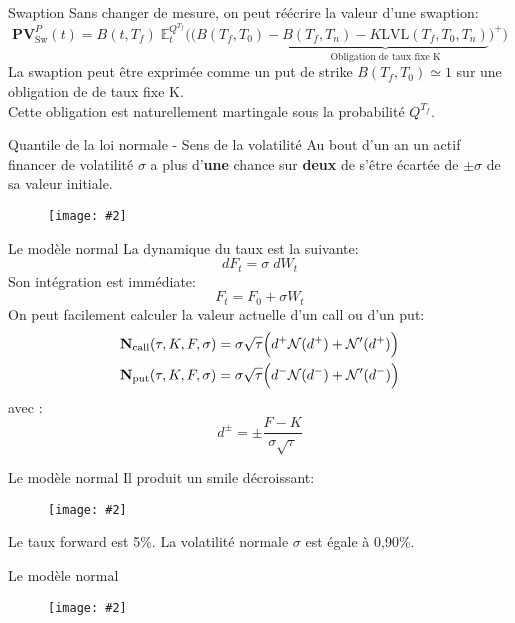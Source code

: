 \documentclass{beamer}
\newcommand{\FIG}[2]{\texttt{[image: \#2]}}
\begin{document}
\begin{frame}{Swaption}
Sans changer de mesure, on peut réécrire la valeur d'une swaption:
\[
\textbf{PV}_\text{Sw}^P(t)=B(t,T_f)\;\mathbb{E}_t^{Q^{T_f}}\Big(\big(B(T_f,T_0)-\underbrace{B(T_f,T_n)-K\text{LVL}(T_f,T_0,T_n)}_{\text{Obligation de taux fixe K}}\big)^+\Big)
\]
La swaption peut être exprimée comme un put de strike $B(T_f,T_0)\simeq1$ sur une obligation de de taux fixe K.\\
\vspace{0.5cm}
Cette obligation est naturellement martingale sous la probabilité $Q^{T_f}$.
\end{frame}

\begin{frame}{Quantile de la loi normale - Sens de la volatilité}
Au bout d'un an un actif financer de volatilité $\sigma$ a plus d'\textbf{une} chance sur \textbf{deux} de s'être écartée de $\pm \sigma$ de sa valeur initiale.
\begin{center}
\begin{figure}[h]
\FIG{11cm}{figures/loinormale_quantile.png}
\end{figure}
\end{center}
\end{frame}

\begin{frame}{Le modèle normal}
La dynamique du taux est la suivante:
\[
dF_t=\sigma\; dW_t
\]
Son intégration est immédiate:
\[
F_t = F_0 + \sigma W_t
\]
On peut facilement calculer la valeur actuelle d'un call ou d'un put:
\[
\begin{split}
&\text{\textbf{N}}_\text{call}(\tau,K,F,\sigma)=\sigma\sqrt{\tau}\Big(d^+\mathcal{N}(d^+)+\mathcal{N}'(d^+)\Big)\\
&\text{\textbf{N}}_\text{put}(\tau,K,F,\sigma)=\sigma\sqrt{\tau}\Big(d^-\mathcal{N}(d^-)+\mathcal{N}'(d^-)\Big)\\
\end{split}
\]
avec :
\[
d^\pm = \pm \frac{F-K}{\sigma\sqrt{\tau}}
\]
\end{frame}

\begin{frame}{Le modèle normal}
Il produit un smile décroissant:
\begin{figure}[h]
\FIG{8cm}{figures/smile_normal.jpg}
\end{figure}
Le taux forward est 5\%. La volatilité normale $\sigma$ est égale à 0,90\%. 
\end{frame}

\begin{frame}{Le modèle normal}
\begin{figure}[h]
\FIG{11cm}{figures/lognormalvsnormal.png}
\end{figure}
\end{frame}
\end{document}
